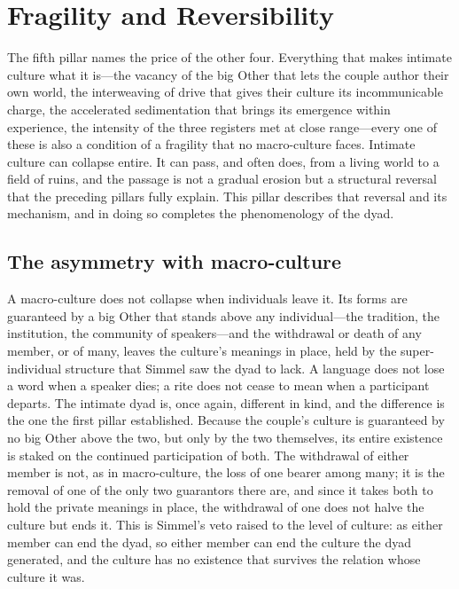 \section{Fragility and Reversibility}
\label{p24:sec:fragility}

\noindent
The fifth pillar names the price of the other four. Everything that makes intimate culture what it is---the vacancy of the big Other that lets the couple author their own world, the interweaving of drive that gives their culture its incommunicable charge, the accelerated sedimentation that brings its emergence within experience, the intensity of the three registers met at close range---every one of these is also a condition of a fragility that no macro-culture faces. Intimate culture can collapse entire. It can pass, and often does, from a living world to a field of ruins, and the passage is not a gradual erosion but a structural reversal that the preceding pillars fully explain. This pillar describes that reversal and its mechanism, and in doing so completes the phenomenology of the dyad.

\subsection*{The asymmetry with macro-culture}

A macro-culture does not collapse when individuals leave it. Its forms are guaranteed by a big Other that stands above any individual---the tradition, the institution, the community of speakers---and the withdrawal or death of any member, or of many, leaves the culture's meanings in place, held by the super-individual structure that Simmel saw the dyad to lack. A language does not lose a word when a speaker dies; a rite does not cease to mean when a participant departs. The intimate dyad is, once again, different in kind, and the difference is the one the first pillar established. Because the couple's culture is guaranteed by no big Other above the two, but only by the two themselves, its entire existence is staked on the continued participation of both. The withdrawal of either member is not, as in macro-culture, the loss of one bearer among many; it is the removal of one of the only two guarantors there are, and since it takes both to hold the private meanings in place, the withdrawal of one does not halve the culture but ends it. This is Simmel's veto raised to the level of culture: as either member can end the dyad, so either member can end the culture the dyad generated, and the culture has no existence that survives the relation whose culture it was.

